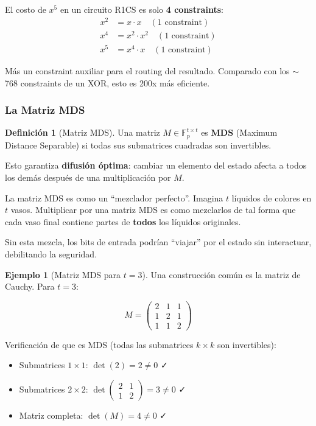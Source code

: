\documentclass[11pt,a4paper,twoside,openright]{book}
\theoremstyle{definition}
\newtheorem{definition}{Definición}[chapter]
\newtheorem{example}{Ejemplo}[chapter]
\theoremstyle{plain}
\theoremstyle{remark}
\newcommand{\F}{\mathbb{F}}
\begin{document}
\begin{keyidea}
El costo de $x^5$ en un circuito R1CS es solo \textbf{4 constraints}:
\begin{align}
x^2 &= x \cdot x \quad (1 \text{ constraint}) \\
x^4 &= x^2 \cdot x^2 \quad (1 \text{ constraint}) \\
x^5 &= x^4 \cdot x \quad (1 \text{ constraint})
\end{align}

Más un constraint auxiliar para el routing del resultado. Comparado con los $\sim$768 constraints de un XOR, esto es 200x más eficiente.
\end{keyidea}

\subsubsection{La Matriz MDS}

\begin{definition}[Matriz MDS]
Una matriz $M \in \F_p^{t \times t}$ es \textbf{MDS} (Maximum Distance Separable) si todas sus submatrices cuadradas son invertibles.

Esto garantiza \textbf{difusión óptima}: cambiar un elemento del estado afecta a todos los demás después de una multiplicación por $M$.
\end{definition}

\begin{intuicion}
La matriz MDS es como un ``mezclador perfecto''. Imagina $t$ líquidos de colores en $t$ vasos. Multiplicar por una matriz MDS es como mezclarlos de tal forma que cada vaso final contiene partes de \textbf{todos} los líquidos originales.

Sin esta mezcla, los bits de entrada podrían ``viajar'' por el estado sin interactuar, debilitando la seguridad.
\end{intuicion}

\begin{example}[Matriz MDS para $t = 3$]
Una construcción común es la matriz de Cauchy. Para $t = 3$:

\[
M = \begin{pmatrix}
2 & 1 & 1 \\
1 & 2 & 1 \\
1 & 1 & 2
\end{pmatrix}
\]

Verificación de que es MDS (todas las submatrices $k \times k$ son invertibles):
\begin{itemize}
    \item Submatrices $1 \times 1$: $\det(2) = 2 \neq 0$ ✓
    \item Submatrices $2 \times 2$: $\det\begin{pmatrix} 2 & 1 \\ 1 & 2 \end{pmatrix} = 3 \neq 0$ ✓
    \item Matriz completa: $\det(M) = 4 \neq 0$ ✓
\end{itemize}
\end{example}
\end{document}
